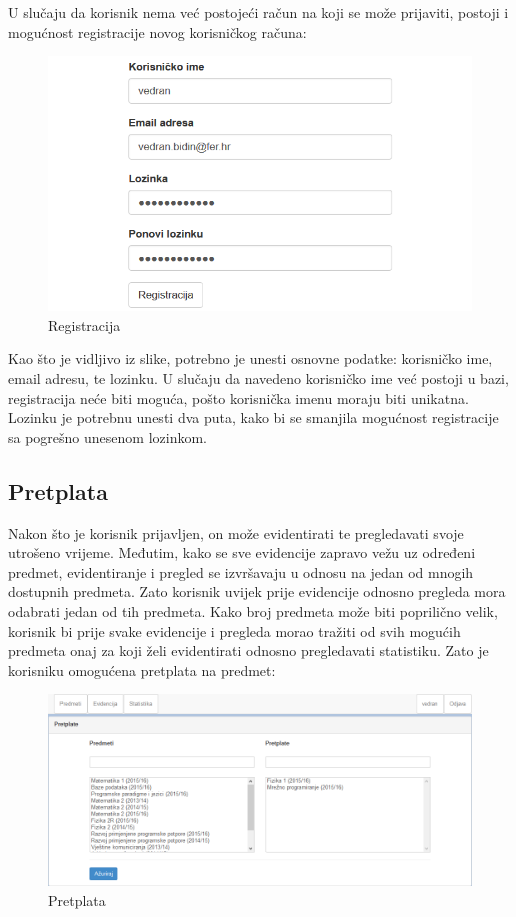 \documentclass[times, utf8, zavrsni, numeric]{fer}
\begin{document}
U slučaju da korisnik nema već postojeći račun na koji se može prijaviti, postoji i mogućnost registracije novog korisničkog računa:

\begin{figure}[H]
\centering
\includegraphics[width=\textwidth,height=\textheight,keepaspectratio]{img/registracija.png}
\caption{Registracija}
\label{fig:registracija}
\end{figure}


Kao što je vidljivo iz slike, potrebno je unesti osnovne podatke: korisničko ime, email adresu, te lozinku. U slučaju da navedeno korisničko ime već postoji u bazi, registracija neće biti moguća, pošto korisnička imenu moraju biti unikatna. Lozinku je potrebnu unesti dva puta, kako bi se smanjila mogućnost registracije sa pogrešno unesenom lozinkom.

\subsection{Pretplata}
Nakon što je korisnik prijavljen, on može evidentirati te pregledavati svoje utrošeno vrijeme. Međutim, kako se sve evidencije zapravo vežu uz određeni predmet, evidentiranje i pregled se izvršavaju u odnosu na jedan od mnogih dostupnih predmeta. Zato korisnik uvijek prije evidencije odnosno pregleda mora odabrati jedan od tih predmeta. Kako broj predmeta može biti poprilično velik, korisnik bi prije svake evidencije i pregleda morao tražiti od svih mogućih predmeta onaj za koji želi evidentirati odnosno pregledavati statistiku. Zato je korisniku omogućena pretplata na predmet:

\begin{figure}[H]
\centering
\includegraphics[width=\textwidth,height=\textheight,keepaspectratio]{img/pretplata-web.png}
\caption{Pretplata}
\label{fig:pretplata-web}
\end{figure}
\end{document}

